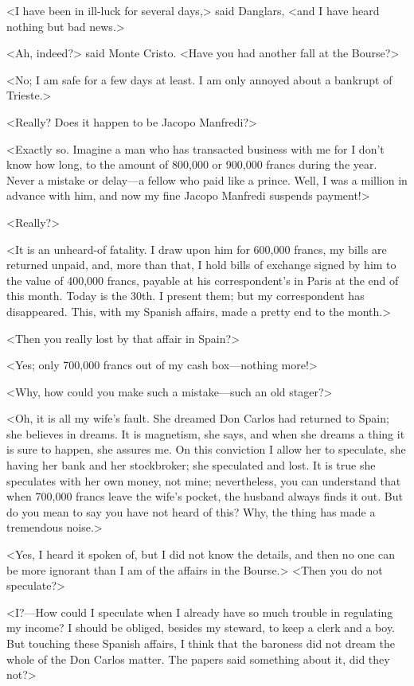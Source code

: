  <I have been in ill-luck for several days,> said Danglars, <and I have heard nothing but bad news.> 

 <Ah, indeed?> said Monte Cristo. <Have you had another fall at the Bourse?> 

 <No; I am safe for a few days at least. I am only annoyed about a bankrupt of Trieste.> 

 <Really? Does it happen to be Jacopo Manfredi?> 

 <Exactly so. Imagine a man who has transacted business with me for I don't know how long, to the amount of 800,000 or 900,000 francs during the year. Never a mistake or delay—a fellow who paid like a prince. Well, I was a million in advance with him, and now my fine Jacopo Manfredi suspends payment!> 

 <Really?> 

 <It is an unheard-of fatality. I draw upon him for 600,000 francs, my bills are returned unpaid, and, more than that, I hold bills of exchange signed by him to the value of 400,000 francs, payable at his correspondent's in Paris at the end of this month. Today is the 30th. I present them; but my correspondent has disappeared. This, with my Spanish affairs, made a pretty end to the month.> 

 <Then you really lost by that affair in Spain?> 

 <Yes; only 700,000 francs out of my cash box—nothing more!> 

 <Why, how could you make such a mistake—such an old stager?> 

 <Oh, it is all my wife's fault. She dreamed Don Carlos had returned to Spain; she believes in dreams. It is magnetism, she says, and when she dreams a thing it is sure to happen, she assures me. On this conviction I allow her to speculate, she having her bank and her stockbroker; she speculated and lost. It is true she speculates with her own money, not mine; nevertheless, you can understand that when 700,000 francs leave the wife's pocket, the husband always finds it out. But do you mean to say you have not heard of this? Why, the thing has made a tremendous noise.> 

 <Yes, I heard it spoken of, but I did not know the details, and then no one can be more ignorant than I am of the affairs in the Bourse.>  <Then you do not speculate?> 

 <I?—How could I speculate when I already have so much trouble in regulating my income? I should be obliged, besides my steward, to keep a clerk and a boy. But touching these Spanish affairs, I think that the baroness did not dream the whole of the Don Carlos matter. The papers said something about it, did they not?> 

